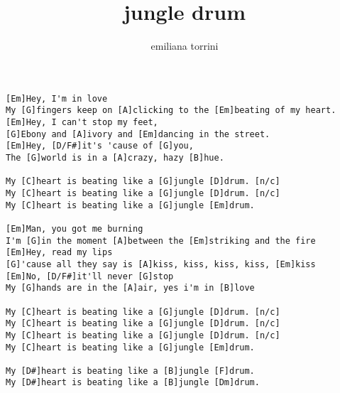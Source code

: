 \author{emiliana torrini}
\title{jungle drum}
\maketitle
\begin{verbatim}
[Em]Hey, I'm in love
My [G]fingers keep on [A]clicking to the [Em]beating of my heart.
[Em]Hey, I can't stop my feet,
[G]Ebony and [A]ivory and [Em]dancing in the street.
[Em]Hey, [D/F#]it's 'cause of [G]you,
The [G]world is in a [A]crazy, hazy [B]hue.

My [C]heart is beating like a [G]jungle [D]drum. [n/c]
My [C]heart is beating like a [G]jungle [D]drum. [n/c]
My [C]heart is beating like a [G]jungle [Em]drum.

[Em]Man, you got me burning 
I'm [G]in the moment [A]between the [Em]striking and the fire
[Em]Hey, read my lips 
[G]'cause all they say is [A]kiss, kiss, kiss, kiss, [Em]kiss
[Em]No, [D/F#]it'll never [G]stop
My [G]hands are in the [A]air, yes i'm in [B]love

My [C]heart is beating like a [G]jungle [D]drum. [n/c]
My [C]heart is beating like a [G]jungle [D]drum. [n/c]
My [C]heart is beating like a [G]jungle [D]drum. [n/c]
My [C]heart is beating like a [G]jungle [Em]drum.

My [D#]heart is beating like a [B]jungle [F]drum.
My [D#]heart is beating like a [B]jungle [Dm]drum.
\end{verbatim}